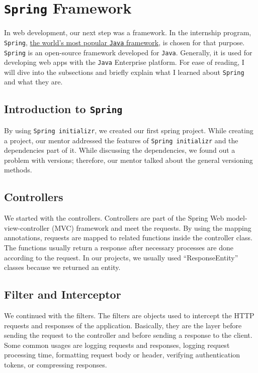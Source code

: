 \section{\texttt{Spring} Framework}

In web development, our next step was a framework. In the internship program, \texttt{Spring}, \href{https://spring.io/why-spring}{the world's most popular \texttt{Java} framework}, is chosen for that purpose. \texttt{Spring} is an open-source framework developed for \texttt{Java}. Generally, it is used for developing web apps with the \texttt{Java} Enterprise platform. For ease of reading, I will dive into the subsections and briefly explain what I learned about \texttt{Spring} and what they are.

\subsection{Introduction to \texttt{Spring}}

By using \texttt{Spring initializr}, we created our first spring project. While creating a project, our mentor addressed the features of \texttt{Spring initializr} and the dependencies part of it. While discussing the dependencies, we found out a problem with versions; therefore, our mentor talked about the general versioning methods.

\subsection{Controllers}

We started with the controllers. Controllers are part of the Spring Web model-view-controller (MVC) framework and meet the requests. By using the mapping annotations, requests are mapped to related functions inside the controller class. The functions usually return a response after necessary processes are done according to the request. In our projects, we usually used ``ResponseEntity'' classes because we returned an entity.

\subsection{Filter and Interceptor}

We continued with the filters. The filters are objects used to intercept the HTTP requests and responses of the application. Basically, they are the layer before sending the request to the controller and before sending a response to the client. Some common usages are logging requests and responses, logging request processing time, formatting request body or header, verifying authentication tokens, or compressing responses.

